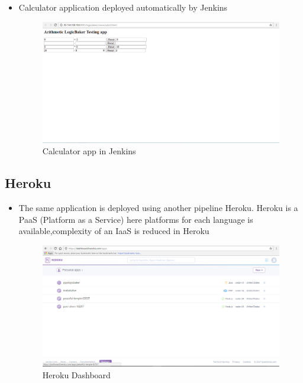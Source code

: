 \documentclass[12pt,a4paper,oneside]{report}
\begin{document}
{\begin{itemize}
\subsection{Calculator app in Jenkins}
\item \par Calculator application deployed automatically by Jenkins
\begin{figure}[h]
\begin{center}
\includegraphics[scale=.47]{app.png}
\caption{Calculator app in Jenkins}
\label{Calculator app in Jenkins }
\end{center}
\end{figure}
\end{itemize}
\newpage
\subsection{Heroku}
\begin{itemize}
\item \par The same application is deployed using another pipeline Heroku. Heroku is a PaaS (Platform as a Service) here platforms for each language is available,complexity of an IaaS is reduced in Heroku
\begin{figure}[h]
\begin{center}
\includegraphics[scale=.47]{hrk.png}
\caption{Heroku Dashboard}
\label{Heroku Dashboard}
\end{center}
\end{figure}
\end{itemize}
\newpage
}
\end{document}
